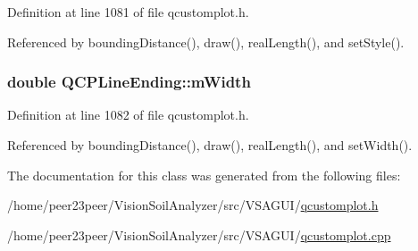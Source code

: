 Definition at line 1081 of file qcustomplot.\+h.



Referenced by bounding\+Distance(), draw(), real\+Length(), and set\+Style().

\hypertarget{class_q_c_p_line_ending_aca89d21341133c20dc6825c33a5eac48}{}
\subsubsection[{m\+Width}]{\setlength{\rightskip}{0pt plus 5cm}double Q\+C\+P\+Line\+Ending\+::m\+Width\hspace{0.3cm}{\ttfamily [protected]}}\label{class_q_c_p_line_ending_aca89d21341133c20dc6825c33a5eac48}


Definition at line 1082 of file qcustomplot.\+h.



Referenced by bounding\+Distance(), draw(), real\+Length(), and set\+Width().



The documentation for this class was generated from the following files\+:\begin{DoxyCompactItemize}
\item 
/home/peer23peer/\+Vision\+Soil\+Analyzer/src/\+V\+S\+A\+G\+U\+I/\hyperlink{qcustomplot_8h}{qcustomplot.\+h}\item 
/home/peer23peer/\+Vision\+Soil\+Analyzer/src/\+V\+S\+A\+G\+U\+I/\hyperlink{qcustomplot_8cpp}{qcustomplot.\+cpp}\end{DoxyCompactItemize}
